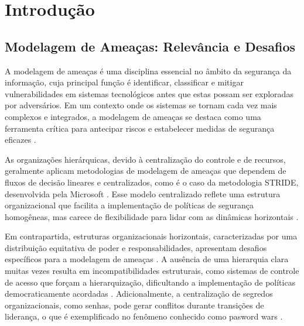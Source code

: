 
%

%

\chapter{Introdução}
\label{cha:Introduction}

\section{Modelagem de Ameaças: Relevância e Desafios}
\label{sec:modelagem_ameacas}

A modelagem de ameaças é uma disciplina essencial no âmbito da segurança da
informação, cuja principal função é identificar, classificar e mitigar
vulnerabilidades em sistemas tecnológicos antes que estas possam ser exploradas
por adversários. Em um contexto onde os sistemas se tornam cada vez mais
complexos e integrados, a modelagem de ameaças se destaca como uma ferramenta
crítica para antecipar riscos e estabelecer medidas de segurança eficazes
\cite{ThreatModellingSurvey}.

As organizações hierárquicas, devido à centralização do controle e de recursos,
geralmente aplicam metodologias de modelagem de ameaças que dependem de fluxos
de decisão lineares e centralizados, como é o caso da metodologia STRIDE,
desenvolvida pela Microsoft \cite{ThreatModelingASummaryOfAvailableMethods}.
Esse modelo centralizado reflete uma estrutura organizacional que facilita a
implementação de políticas de segurança homogêneas, mas carece de flexibilidade
para lidar com as dinâmicas horizontais
\cite{EvaluationofCompetingThreatModeling}.

Em contrapartida, estruturas organizacionais horizontais, caracterizadas por uma
distribuição equitativa de poder e responsabilidades, apresentam desafios
específicos para a modelagem de ameaças \cite{Colbac}. A ausência de uma
hierarquia clara muitas vezes resulta em incompatibilidades estruturais, como
sistemas de controle de acesso que forçam a hierarquização, dificultando a
implementação de políticas democraticamente acordadas \cite{Colbac}.
Adicionalmente, a centralização de segredos organizacionais, como senhas, pode
gerar conflitos durante transições de liderança, o que é exemplificado no
fenômeno conhecido como pasword wars \cite{FromCounterpublicstoContentious}.

